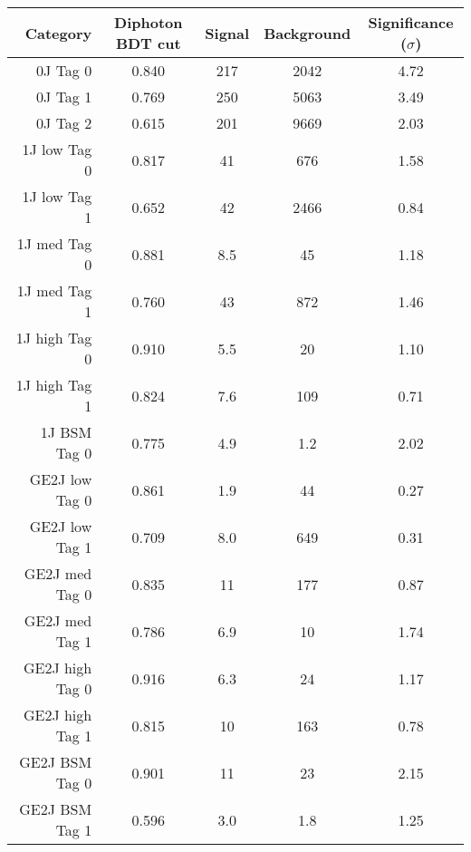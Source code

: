 \begin{tabular}{ r | c | c | c | c } 
\hline 
Category         & Diphoton BDT cut & Signal & Background & Significance ($\sigma$) \\
\hline 
0J Tag 0         & 0.840            & 217    & 2042       & 4.72                    \\
0J Tag 1         & 0.769            & 250    & 5063       & 3.49                    \\
0J Tag 2         & 0.615            & 201    & 9669       & 2.03                    \\
\hline                                                                              
1J low  Tag 0    & 0.817            & 41     & 676        & 1.58                    \\
1J low  Tag 1    & 0.652            & 42     & 2466       & 0.84                    \\
1J med  Tag 0    & 0.881            & 8.5    & 45         & 1.18                    \\
1J med  Tag 1    & 0.760            & 43     & 872        & 1.46                    \\
1J high Tag 0    & 0.910            & 5.5    & 20         & 1.10                    \\
1J high Tag 1    & 0.824            & 7.6    & 109        & 0.71                    \\
1J BSM  Tag 0    & 0.775            & 4.9    & 1.2        & 2.02                    \\
\hline                                                                              
GE2J low  Tag 0  & 0.861            & 1.9    & 44         & 0.27                    \\
GE2J low  Tag 1  & 0.709            & 8.0    & 649        & 0.31                    \\
GE2J med  Tag 0  & 0.835            & 11     & 177        & 0.87                    \\
GE2J med  Tag 1  & 0.786            & 6.9    & 10         & 1.74                    \\
GE2J high Tag 0  & 0.916            & 6.3    & 24         & 1.17                    \\
GE2J high Tag 1  & 0.815            & 10     & 163        & 0.78                    \\
GE2J BSM  Tag 0  & 0.901            & 11     & 23         & 2.15                    \\
GE2J BSM  Tag 1  & 0.596            & 3.0    & 1.8        & 1.25                    \\
\hline 
\end{tabular}
